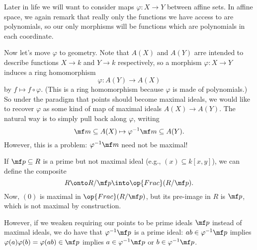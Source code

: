 Later in life we will want to consider maps $\varphi:X\to Y$ between affine sets. In affine space, we again remark that really only the functions we have access to are polynomials, so our only morphisms will be functions which are polynomials in each coordinate.

Now let's move $\varphi$ to geometry. Note that $A(X)$ and $A(Y)$ arre intended to describe functions $X\to k$ and $Y\to k$ respectively, so a morphism $\varphi:X\to Y$ induces a ring homomorphism
\[\varphi:A(Y)\rightarrow A(X)\]
by $f\mapsto f\circ\varphi$. (This is a ring homomorphism because $\varphi$ is made of polynomials.) So under the paradigm that points should become maximal ideals, we would like to recover $\varphi$ as some kind of map of maximal ideals $A(X)\to A(Y)$. The natural way is to simply pull back along $\varphi$, writing
\[\mf m\subseteq A(X)\mapsto\varphi^{-1}\mf m\subseteq A(Y).\]
However, this is a problem: $\varphi^{-1}\mf m$ need not be maximal!
\begin{example}
	If $\mf p\subseteq R$ is a prime but not maximal ideal (e.g., $(x)\subseteq k[x,y]$), we can define the composite
	\[R\onto R/\mf p\into\op{Frac}(R/\mf p).\]
	Now, $(0)$ is maximal in $\op{Frac}(R/\mf p)$, but its pre-image in $R$ is $\mf p$, which is not maximal by construction.
\end{example}
However, if we weaken requiring our points to be prime ideals $\mf p$ instead of maximal ideals, we do have that $\varphi^{-1}\mf p$ is a prime ideal: $ab\in\varphi^{-1}\mf p$ implies $\varphi(a)\varphi(b)=\varphi(ab)\in\mf p$ implies $a\in\varphi^{-1}\mf p$ or $b\in\varphi^{-1}\mf p$.

